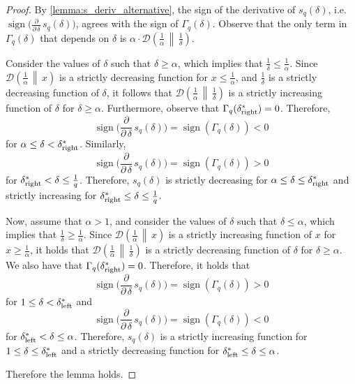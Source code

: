 \documentclass[letterpaper,11pt]{article}
\DeclareMathOperator{\sign}{sign}
\newcommand{\1}[1]{\mathds{1}\left[#1\right]}
\newcommand{\D}[2]{\mathcal{D}\left(#1\, \middle\|\,#2 \right)}
\newcommand{\sdeltal}{\delta^{*}_{\textnormal{left}}}
\newcommand{\sdeltar}{\delta^{*}_{\textnormal{right}}}
\begin{document}
\begin{proof}
	By \cref{lemma:s_deriv_alternative}, the sign of the derivative of
	$s_q(\delta)$, i.e. $\sign\biggl(\frac{\partial}{\partial\,\delta}\,s_{q}(\delta)\biggr)$,
	agrees with the sign of $\Gamma_q(\delta)$. Observe that the only term
	in $\Gamma_q(\delta)$ that depends on $\delta$ is $\alpha \cdot \D{\frac{1}{\alpha}}{\frac{1}{\delta}}$.
	
	Consider the values of $\delta$ such that $\delta \geq \alpha$, which implies that
	$\frac{1}{\delta} \leq \frac{1}{\alpha}$. Since $\D{\frac{1}{\alpha}}{x}$ is a strictly
	decreasing function for $x \leq \frac{1}{\alpha}$, and $\frac{1}{\delta}$ is a
	strictly decreasing function of $\delta$, it follows that $\D{\frac{1}{\alpha}}{\frac{1}{\delta}}$
	is a strictly increasing function of $\delta$ for $\delta \geq \alpha$.
	Furthermore, observe that $\Gamma_q(\sdeltar) = 0$. Therefore,
	\begin{equation*}
		\sign\biggl(\frac{\partial}{\partial\,\delta}\,s_{q}(\delta)\biggr) = \sign\left( \Gamma_q(\delta) \right) < 0
	\end{equation*}
	for $\alpha \leq \delta < \sdeltar$. Similarly,
	\begin{equation*}
		\sign\biggl(\frac{\partial}{\partial\,\delta}\,s_{q}(\delta)\biggr) = \sign\left( \Gamma_q(\delta) \right) > 0		
	\end{equation*}
	for $\sdeltar < \delta \leq \frac{1}{q}$. Therefore, $s_q(\delta)$ is strictly decreasing for $\alpha \leq \delta \leq \sdeltar$
	and strictly increasing for $\sdeltar \leq \delta \leq \frac{1}{q}$.

	Now, assume that $\alpha > 1$, and consider the values of $\delta$ such that $\delta \leq \alpha$,
	which implies that $\frac{1}{\delta} \geq \frac{1}{\alpha}$. Since $\D{\frac{1}{\alpha}}{x}$
	is a strictly increasing function of $x$ for $x \geq \frac{1}{\alpha}$, it holds that
	$\D{\frac{1}{\alpha}}{\frac{1}{\delta}}$ is a strictly decreasing function
	of $\delta$ for $\delta \geq \alpha$. We also have that $\Gamma_q(\sdeltar) = 0$.
	Therefore, it holds that
	\begin{equation*}
		\sign\biggl(\frac{\partial}{\partial\,\delta}\,s_{q}(\delta)\biggr) = \sign\left( \Gamma_q(\delta) \right) >0
	\end{equation*}
	for $1 \leq \delta < \sdeltal$ and
	\begin{equation*}
		\sign\biggl(\frac{\partial}{\partial\,\delta}\,s_{q}(\delta)\biggr) = \sign\left( \Gamma_q(\delta) \right) < 0		
	\end{equation*}
	for $\sdeltal < \delta \leq \alpha$. Therefore, $s_q(\delta)$ is a strictly increasing
	function for $1 \leq \delta \leq \sdeltal$ and a strictly decreasing function for
	$\sdeltal \leq \delta \leq \alpha$.

	Therefore the lemma holds.
\end{proof}
\end{document}
